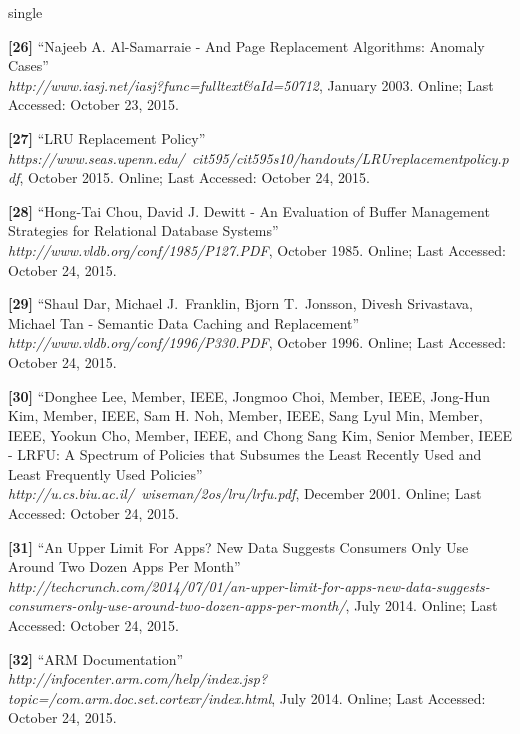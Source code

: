 \documentclass[12pt]{uthesis-v12}  %
\begin{document}
\begin{referencelist}{single}
	\item \textbf{[26]} ``Najeeb A. Al-Samarraie - And Page Replacement Algorithms: Anomaly Cases''
	\\\emph{http://www.iasj.net/iasj?func=fulltext\&aId=50712}, January 2003. 
	Online; Last Accessed: October 23, 2015.
										
	\item \textbf{[27]} ``LRU Replacement Policy''
	\\\emph{https://www.seas.upenn.edu/~cit595/cit595s10/handouts/LRUreplacementpolicy.pdf}, October 2015. 
	Online; Last Accessed: October 24, 2015.
	
	\item \textbf{[28]} ``Hong-Tai Chou, David J. Dewitt - An Evaluation of Buffer Management Strategies for Relational Database Systems''
	\\\emph{http://www.vldb.org/conf/1985/P127.PDF}, October 1985. 
	Online; Last Accessed: October 24, 2015.
	
	\item \textbf{[29]} ``Shaul Dar, Michael J.~Franklin, Bjorn T.~Jonsson, Divesh Srivastava, Michael Tan - Semantic Data Caching and Replacement''
	\\\emph{http://www.vldb.org/conf/1996/P330.PDF}, October 1996. 
	Online; Last Accessed: October 24, 2015.
	
	\item \textbf{[30]} ``Donghee Lee, Member, IEEE, Jongmoo Choi, Member, IEEE, Jong-Hun Kim, Member, IEEE,
	Sam H. Noh, Member, IEEE, Sang Lyul Min, Member, IEEE, Yookun Cho, Member, IEEE, and
	Chong Sang Kim, Senior Member, IEEE - LRFU: A Spectrum of Policies that
	Subsumes the Least Recently Used and
	Least Frequently Used Policies''
	\\\emph{http://u.cs.biu.ac.il/~wiseman/2os/lru/lrfu.pdf}, December 2001. 
	Online; Last Accessed: October 24, 2015.

	\item \textbf{[31]} ``An Upper Limit For Apps? New Data Suggests Consumers Only Use Around Two Dozen Apps Per Month''
	\\\emph{http://techcrunch.com/2014/07/01/an-upper-limit-for-apps-new-data-suggests-consumers-only-use-around-two-dozen-apps-per-month/}, July 2014. 
	Online; Last Accessed: October 24, 2015.
											
	\item \textbf{[32]} ``ARM Documentation''
	\\\emph{http://infocenter.arm.com/help/index.jsp?topic=/com.arm.doc.set.cortexr/index.html}, July 2014. 
	Online; Last Accessed: October 24, 2015.


\end{referencelist}
\end{document}
